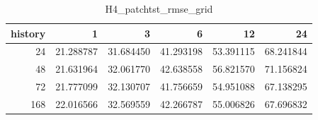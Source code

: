 \begin{table}
\caption{H4_patchtst_rmse_grid}
\label{tab:H4_patchtst_rmse_grid}
\begin{tabular}{rrrrrr}
\toprule
history & 1 & 3 & 6 & 12 & 24 \\
\midrule
24 & 21.288787 & 31.684450 & 41.293198 & 53.391115 & 68.241844 \\
48 & 21.631964 & 32.061770 & 42.638558 & 56.821570 & 71.156824 \\
72 & 21.777099 & 32.130707 & 41.756659 & 54.951088 & 67.138295 \\
168 & 22.016566 & 32.569559 & 42.266787 & 55.006826 & 67.696832 \\
\bottomrule
\end{tabular}
\end{table}
